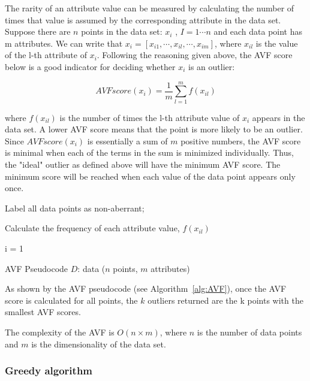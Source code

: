\noindent The rarity of an attribute value can be measured by calculating the number of times that value is assumed by the corresponding attribute in the data set. \\

\noindent Suppose there are $n$ points in the data set: $x_i$ , $I = 1 \cdots n$ and each data point has m attributes. We can write that $x_{i} = [x_{i1}, \cdots , x_{il}, \cdots, x_{im}]$, where $x_{il}$ is the value of the l-th attribute of $x_i$. Following the reasoning given above, the AVF score below is a good indicator for deciding whether $x_i$ is an outlier:

$$AVFscore(x_i) = \frac{1}{m} \sum_{l=1}^{m}f(x_{il})$$


\noindent where $f(x_{il})$ is the number of times the l-th attribute value of $x_i$ appears in the data set. A lower AVF score means that the point is more likely to be an outlier. Since $AVFscore(x_i) $ is essentially a sum of $m$ positive numbers, the AVF score is minimal when each of the terms in the sum is minimized individually. Thus, the "ideal" outlier as defined above will have the minimum AVF score. The minimum score will be reached when each value of the data point appears only once.  


\begin{algorithm}
\SetAlgoLined
Label all data points as non-aberrant;

Calculate the frequency of each attribute value, $f(x_{il})$ \;

i = 1 \;


\caption{AVF Pseudocode $D$: data ($n$ points, $m$ attributes)}
\label{alg:AVF}
\end{algorithm}%

\noindent As shown by the AVF pseudocode (see Algorithm~\ref{alg:AVF}), once the AVF score is calculated for all points, the $k$ outliers returned are the k points with the smallest AVF scores. 

\noindent The complexity of the AVF is $O(n\times m)$, where $n$ is the number of data points and $m$ is the dimensionality of the data set.


\subsubsection*{Greedy algorithm}

